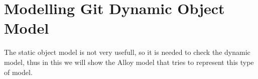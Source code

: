 \section {Modelling Git Dynamic Object Model}
The static object model is not very usefull, so it is needed
to check the dynamic model, thus in this we will
show the Alloy model that tries to represent this 
type of model.
